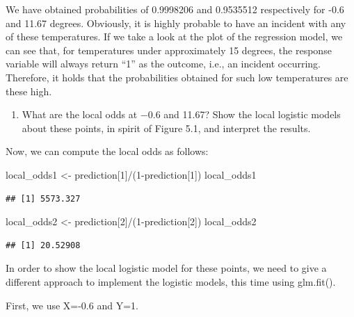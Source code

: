 \documentclass[
]{article}
\newenvironment{Shaded}{\begin{snugshade}}{\end{snugshade}}
\newcommand{\DecValTok}[1]{\textcolor[rgb]{0.00,0.00,0.81}{#1}}
\newcommand{\NormalTok}[1]{#1}
\newcommand{\OtherTok}[1]{\textcolor[rgb]{0.56,0.35,0.01}{#1}}
\newcommand{\SpecialCharTok}[1]{\textcolor[rgb]{0.00,0.00,0.00}{#1}}
\providecommand{\tightlist}{%
  \setlength{\itemsep}{0pt}\setlength{\parskip}{0pt}}
\begin{document}
We have obtained probabilities of 0.9998206 and 0.9535512 respectively
for -0.6 and 11.67 degrees. Obviously, it is highly probable to have an
incident with any of these temperatures. If we take a look at the plot
of the regression model, we can see that, for temperatures under
approximately 15 degrees, the response variable will always return ``1''
as the outcome, i.e., an incident occurring. Therefore, it holds that
the probabilities obtained for such low temperatures are these high.

\begin{enumerate}
\def\labelenumi{\alph{enumi}.}
\setcounter{enumi}{3}
\tightlist
\item
  What are the local odds at −0.6 and 11.67? Show the local logistic
  models about these points, in spirit of Figure 5.1, and interpret the
  results.
\end{enumerate}

Now, we can compute the local odds as follows:

\begin{Shaded}
\begin{Highlighting}[]
\NormalTok{local\_odds1 }\OtherTok{\textless{}{-}}\NormalTok{ prediction[}\DecValTok{1}\NormalTok{]}\SpecialCharTok{/}\NormalTok{(}\DecValTok{1}\SpecialCharTok{{-}}\NormalTok{prediction[}\DecValTok{1}\NormalTok{])}
\NormalTok{local\_odds1}
\end{Highlighting}
\end{Shaded}

\begin{verbatim}
## [1] 5573.327
\end{verbatim}

\begin{Shaded}
\begin{Highlighting}[]
\NormalTok{local\_odds2 }\OtherTok{\textless{}{-}}\NormalTok{ prediction[}\DecValTok{2}\NormalTok{]}\SpecialCharTok{/}\NormalTok{(}\DecValTok{1}\SpecialCharTok{{-}}\NormalTok{prediction[}\DecValTok{2}\NormalTok{])}
\NormalTok{local\_odds2}
\end{Highlighting}
\end{Shaded}

\begin{verbatim}
## [1] 20.52908
\end{verbatim}

In order to show the local logistic model for these points, we need to
give a different approach to implement the logistic models, this time
using glm.fit().

First, we use X=-0.6 and Y=1.
\end{document}
